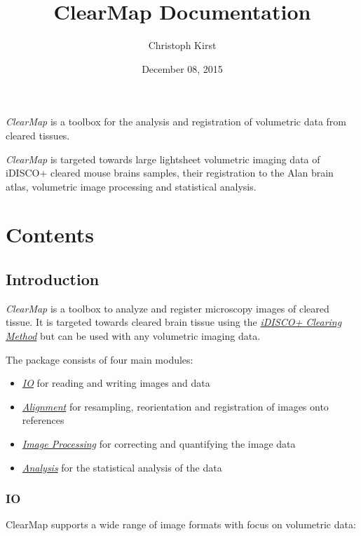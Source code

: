 \documentclass[letterpaper,10pt,english]{sphinxmanual}
\title{ClearMap Documentation}
\date{December 08, 2015}
\author{Christoph Kirst}
\begin{document}
\maketitle
\tableofcontents
{}\label{index::doc}


\emph{ClearMap} is a toolbox for the analysis and registration of volumetric data
from cleared tissues.

\emph{ClearMap} is targeted towards large lightsheet volumetric imaging data
of iDISCO+ cleared mouse brains samples, their registration to the Alan brain atlas,
volumetric image processing and statistical analysis.


\chapter{Contents}
\label{index:clearmap}\label{index:contents}

\section{Introduction}
\label{introduction:introduction}\label{introduction::doc}
\emph{ClearMap} is a toolbox to analyze and register microscopy images of cleared
tissue. It is targeted towards cleared brain tissue using the {\hyperref[introduction:idisco-clearing-method]{\emph{iDISCO+ Clearing Method}}}
but can be used with any volumetric imaging data.

The package consists of four main modules:
\begin{itemize}
\item {} 
{\hyperref[introduction:io]{\emph{IO}}} for reading and writing images and data

\item {} 
{\hyperref[introduction:alignment]{\emph{Alignment}}} for resampling, reorientation and registration of images onto references

\item {} 
{\hyperref[introduction:image-processing]{\emph{Image Processing}}} for correcting and quantifying the image data

\item {} 
{\hyperref[introduction:analysis]{\emph{Analysis}}} for the statistical analysis of the data

\end{itemize}


\subsection{IO}
\label{introduction:io}
ClearMap supports a wide range of image formats with focus on volumetric data:
\end{document}
